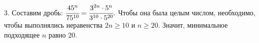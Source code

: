 3. Составим дробь: $\cfrac{45^n}{75^{10}}=\cfrac{3^{2n}\cdot5^n}{3^{10}\cdot5^{20}}.$ Чтобы она была целым числом, необходимо, чтобы выполнялись неравенства $2n\geqslant10$ и $n\geqslant20.$ Значит, минимальное подходящее $n$ равно 20.\\
